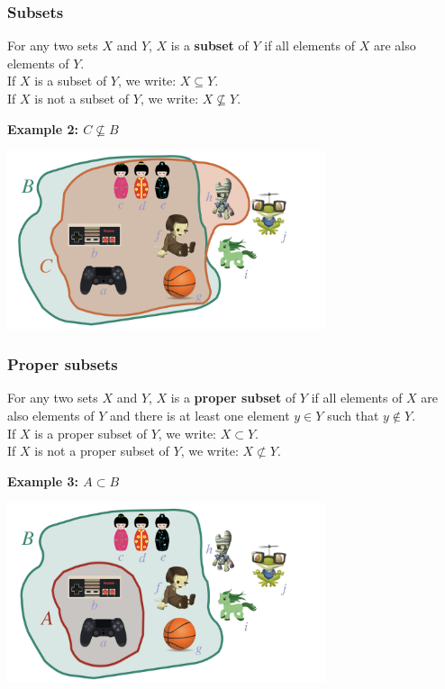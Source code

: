 \documentclass[fleqn,10pt,serif,xcolor=svgnames,xcolor=table,aspectratio=169,handout]{beamer}
\begin{document}
\begin{frame}
  \frametitle{Subsets}

  For any two sets $X$ and $Y$, $X$ is a \textbf{subset} of $Y$ if all elements of $X$ are also elements of $Y$. \\
  If $X$ is a subset of $Y$, we write: $X \subseteq Y$.\\
  If $X$ is not a subset of $Y$, we write: $X \not \subseteq Y$.

  \bigskip

  \hfill \textbf{Example 2: $C \not \subseteq B$}

  \hfill \includegraphics[width = 0.7\textwidth]{01b-sets-relations-operations/01b-sets-relations-operations-002.jpeg}

\end{frame}

\begin{frame}
  \frametitle{Proper subsets}

  For any two sets $X$ and $Y$, $X$ is a \textbf{proper subset} of $Y$ if all elements of $X$ are also elements of $Y$ and there is at least one element $y \in Y$ such that $y \not \in Y$.\\
  If $X$ is a proper subset of $Y$, we write: $X \subset Y$.\\
  If $X$ is not a proper subset of $Y$, we write: $X \not \subset Y$.

\pause

  \bigskip

  \hfill \textbf{Example 3: $A \subset B$}

  \hfill \includegraphics[width = 0.7\textwidth]{01b-sets-relations-operations/01b-sets-relations-operations-001.jpeg}

\end{frame}
\end{document}
